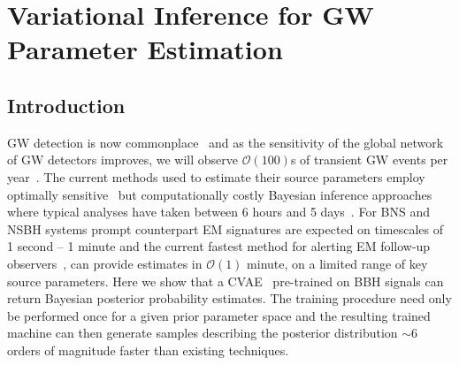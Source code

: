 \chapter{Variational Inference for GW Parameter Estimation}


\section{Introduction}

%
%
\ac{GW} detection is now
commonplace~\cite{PhysRevX.6.041015,PhysRevLett.119.161101} and as the
sensitivity of the global network of \ac{GW} detectors improves, we will
observe $\mathcal{O}(100)$s of transient \ac{GW} events per
year~\cite{2018LRR....21....3A}. The current methods used to estimate their
source parameters employ optimally sensitive~\cite{2009CQGra..26o5017S} but
computationally costly Bayesian inference approaches~\cite{1409.7215} where
typical analyses have taken between 6 hours and 5 days~\cite{gracedb_O3}.
%
%
For \ac{BNS} and \ac{NSBH} systems prompt counterpart \ac{EM} signatures are
expected on timescales of 1 second -- 1 minute and the current fastest method
for alerting \ac{EM} follow-up observers~\cite{2016PhRvD..93b4013S}, can
provide estimates in $\mathcal{O}(1)$ minute, on a limited range of key source
parameters. 
%
%
Here we show that a \ac{CVAE}~\cite{1904.06264,1812.04405} pre-trained on
\ac{BBH} signals can return Bayesian posterior probability estimates. The
training procedure need only be performed once for a given prior parameter
space and the resulting trained machine can then generate samples describing
the posterior distribution $\sim 6$ orders of magnitude faster than existing
techniques.
%

